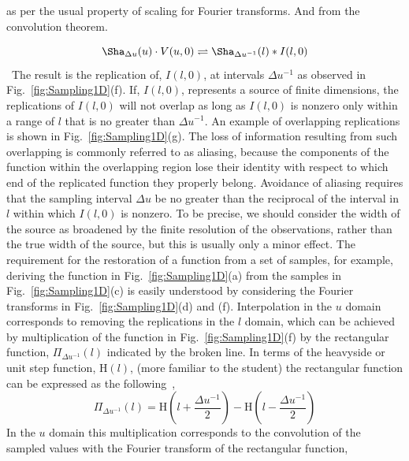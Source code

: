 as per the usual property of scaling for Fourier transforms. And from the convolution theorem. 

\begin{equation}
\Sha_{\Delta{u}}(u)\cdot{V(u,0)} \rightleftharpoons \Sha_{\Delta{u}^{-1}}(l)\ast{I(l,0)}
\end{equation}
{\citep[From][Pg. 127,~Sec.~5.2]{thompson2008interferometry}}~The result is the replication of, $I(l,0)$, at intervals $\Delta{u}^{-1}$ as observed in Fig.~\ref{fig:Sampling1D}{\color{blue}(f)}.
If, $I(l,0)$, represents a source of finite dimensions, the replications of
$I(l,0)$ will not overlap as long as $I(l,0)$ is nonzero only within a range of $l$ that
is no greater than $\Delta{u}^{-1}$. An example of overlapping replications is shown in
Fig.~\ref{fig:Sampling1D}{\color{blue}(g)}. The loss of information resulting from such overlapping is commonly referred to as aliasing, because the components of the function within the overlapping region lose their identity with respect to which end of the replicated function they properly belong. Avoidance of aliasing requires that the sampling interval $\Delta{u}$ be no greater than the reciprocal of the interval in $l$ within which $I(l,0)$ is nonzero. To be precise, we should consider the width of the source as broadened by the finite resolution of the observations, rather than the true width of the source,
but this is usually only a minor effect. The requirement for the restoration of a function from a set of samples, for example, deriving the function in Fig.~\ref{fig:Sampling1D}{\color{blue}(a)} from the samples in Fig.~\ref{fig:Sampling1D}{\color{blue}(c)} is easily understood by considering the Fourier transforms in Fig.~\ref{fig:Sampling1D}{\color{blue}(d)} and {\color{blue}(f)}. Interpolation in the $u$ domain corresponds to removing the replications in the $l$ domain, which can be achieved by multiplication of the function in Fig.~\ref{fig:Sampling1D}{\color{blue}(f)} by the rectangular function, $\Pi_{\Delta{u}^{-1}}(l)$ indicated by the broken line. In terms of the heavyside or unit step function, $\textrm{H}(l)$, (more familiar to the student) the rectangular function can be expressed as the following{~\citep{pjbevel.Box}},
\begin{equation}\Pi_{\Delta{u}^{-1}}(l) = \textrm{H}(l+\frac{\Delta{u}^{-1}}{2})- \textrm{H}(l - \frac{\Delta{u}^{-1}}{2})
\end{equation}
In the $u$ domain this multiplication corresponds to the convolution of the sampled values with the Fourier transform of the rectangular function, 

